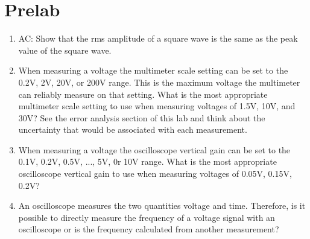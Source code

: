\section{{\bf Prelab}}
\begin{enumerate}
\item AC: Show that the rms amplitude of a square wave is the same as the peak value of the square wave.

\item When measuring a voltage the multimeter scale setting can be set to the 0.2V, 2V, 20V, or 200V range. This is the maximum voltage the multimeter can reliably measure on that setting. What is the most appropriate multimeter scale setting to use when measuring voltages of 1.5V, 10V, and 30V? See the error analysis section of this lab and think about the uncertainty that would be associated with each measurement.
 
\item When measuring a voltage the oscilloscope vertical gain can be set to the 0.1V, 0.2V, 0.5V, ..., 5V, 0r 10V range. What is the most appropriate oscilloscope vertical gain to use when measuring voltages of 0.05V, 0.15V, 0.2V?

\item An oscilloscope measures the two quantities voltage and time. Therefore, is it possible to directly measure the frequency of a voltage signal with an oscilloscope or is the frequency calculated from another measurement? 
\end{enumerate}

